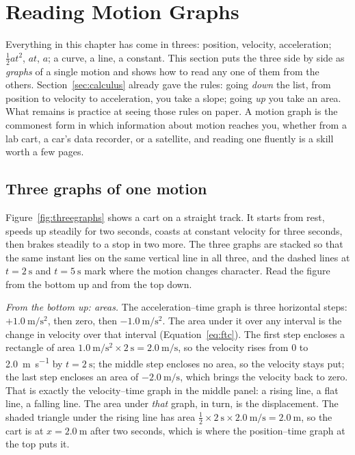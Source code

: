 \section{Reading Motion Graphs}
\label{sec:graphs}

Everything in this chapter has come in threes: position, velocity, acceleration; $\tfrac12 a t^2$, $at$, $a$; a curve, a line, a constant. This section puts the three side by side as \emph{graphs} of a single motion and shows how to read any one of them from the others. Section~\ref{sec:calculus} already gave the rules: going \emph{down} the list, from position to velocity to acceleration, you take a slope; going \emph{up} you take an area. What remains is practice at seeing those rules on paper. A motion graph is the commonest form in which information about motion reaches you, whether from a lab cart, a car's data recorder, or a satellite, and reading one fluently is a skill worth a few pages.

\subsection{Three graphs of one motion}

Figure~\ref{fig:threegraphs} shows a cart on a straight track. It starts from rest, speeds up steadily for two seconds, coasts at constant velocity for three seconds, then brakes steadily to a stop in two more. The three graphs are stacked so that the same instant lies on the same vertical line in all three, and the dashed lines at $t = \SI{2}{\second}$ and $t = \SI{5}{\second}$ mark where the motion changes character. Read the figure from the bottom up and from the top down.

\emph{From the bottom up: areas.} The acceleration--time graph is three horizontal steps: $+\SI{1.0}{\metre\per\second\squared}$, then zero, then $\SI{-1.0}{\metre\per\second\squared}$. The area under it over any interval is the change in velocity over that interval (Equation~\eqref{eq:ftc}). The first step encloses a rectangle of area $\SI{1.0}{\metre\per\second\squared} \times \SI{2}{\second} = \SI{2.0}{\metre\per\second}$, so the velocity rises from $0$ to \SI{2.0}{\metre\per\second} by $t = \SI{2}{\second}$; the middle step encloses no area, so the velocity stays put; the last step encloses an area of $\SI{-2.0}{\metre\per\second}$, which brings the velocity back to zero. That is exactly the velocity--time graph in the middle panel: a rising line, a flat line, a falling line. The area under \emph{that} graph, in turn, is the displacement. The shaded triangle under the rising line has area $\tfrac12 \times \SI{2}{\second} \times \SI{2.0}{\metre\per\second} = \SI{2.0}{\metre}$, so the cart is at $x = \SI{2.0}{\metre}$ after two seconds, which is where the position--time graph at the top puts it.

